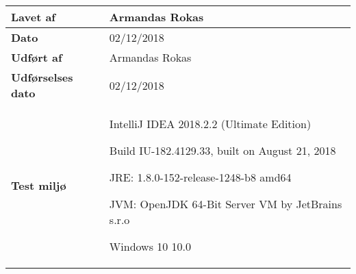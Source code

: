 \documentclass[class=article, crop=false]{standalone}
\makeatletter
\let\savespace\@minipagetrue
\makeatother
\begin{document}
\begin{table}[H]
\begin{tabularx}{\textwidth}{|l|X|}
            \textbf{Lavet af} & Armandas Rokas \\ \hline
            \textbf{Dato} & 02/12/2018 \\ \hline
            \textbf{Udført af } & Armandas Rokas \\ \hline
            \textbf{Udførselses dato}  & 02/12/2018 \\ \hline
            \textbf{Test miljø}  &  \savespace \begin{compactitem}
                                                   \item IntelliJ IDEA 2018.2.2 (Ultimate Edition)
                                                   \item Build IU-182.4129.33, built on August 21, 2018
                                                   \item JRE: 1.8.0-152-release-1248-b8 amd64
                                                   \item JVM: OpenJDK 64-Bit Server VM by JetBrains s.r.o
                                                   \item Windows 10 10.0
            \end{compactitem} \\ \hline
        \end{tabularx}
    \end{table}
\end{document}
